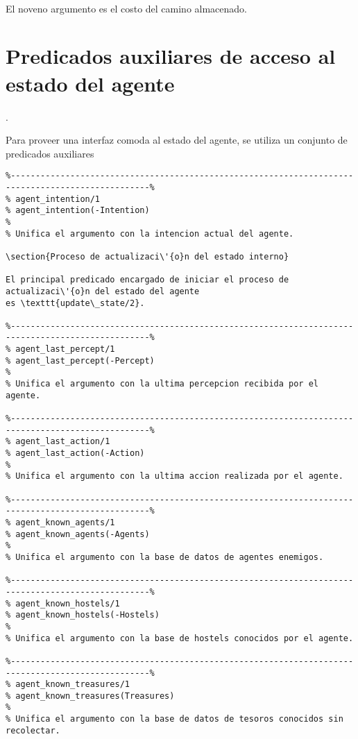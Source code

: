 \documentclass[a4paper,12pt]{report}
\begin{document}
\ 

El noveno argumento es el costo del camino almacenado.

\section{Predicados auxiliares de acceso al estado del agente}.

Para proveer una interfaz comoda al estado del agente, se utiliza un conjunto de predicados auxiliares


\begin{scriptsize}
\begin{verbatim}
%--------------------------------------------------------------------------------------------------%
% agent_intention/1
% agent_intention(-Intention)
%
% Unifica el argumento con la intencion actual del agente.

\section{Proceso de actualizaci\'{o}n del estado interno}

El principal predicado encargado de iniciar el proceso de actualizaci\'{o}n del estado del agente 
es \texttt{update\_state/2}.

%--------------------------------------------------------------------------------------------------%
% agent_last_percept/1
% agent_last_percept(-Percept)
%
% Unifica el argumento con la ultima percepcion recibida por el agente.

%--------------------------------------------------------------------------------------------------%
% agent_last_action/1
% agent_last_action(-Action)
%
% Unifica el argumento con la ultima accion realizada por el agente.

%--------------------------------------------------------------------------------------------------%
% agent_known_agents/1
% agent_known_agents(-Agents)
% 
% Unifica el argumento con la base de datos de agentes enemigos.

%--------------------------------------------------------------------------------------------------%
% agent_known_hostels/1
% agent_known_hostels(-Hostels)
%
% Unifica el argumento con la base de hostels conocidos por el agente.

%--------------------------------------------------------------------------------------------------%
% agent_known_treasures/1
% agent_known_treasures(Treasures)
%
% Unifica el argumento con la base de datos de tesoros conocidos sin recolectar.


\end{verbatim}
\end{scriptsize}
\end{document}
